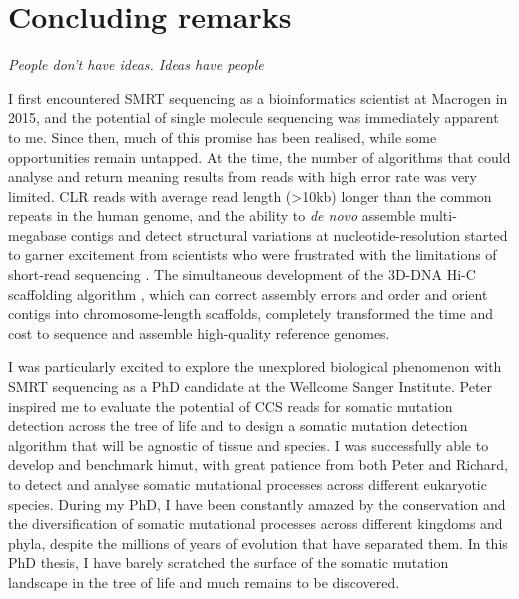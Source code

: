 \section{Concluding remarks}

\textit{People don't have ideas. Ideas have people}
\begin{flushright}  \end{flushright} 

I first encountered SMRT sequencing as a bioinformatics scientist at Macrogen in 2015, and the potential of single molecule sequencing was immediately apparent to me. Since then, much of this promise has been realised, while some opportunities remain untapped. At the time, the number of algorithms that could analyse and return meaning results from reads with high error rate was very limited. CLR reads with average read length (>10kb) longer than the common repeats in the human genome, and the ability to \textit{de novo} assemble multi-megabase contigs \cite {} and detect structural variations at nucleotide-resolution \cite{} started to garner excitement from scientists who were frustrated with the limitations of short-read sequencing \cite{}. The simultaneous development of the 3D-DNA Hi-C scaffolding algorithm \cite{}, which can correct assembly errors and order and orient contigs into chromosome-length scaffolds, completely transformed the time and cost to sequence and assemble high-quality reference genomes. 

I was particularly excited to explore the unexplored biological phenomenon with SMRT sequencing as a PhD candidate at the Wellcome Sanger Institute. Peter inspired me to evaluate the potential of CCS reads for somatic mutation detection across the tree of life and to design a somatic mutation detection algorithm that will be agnostic of tissue and species. I was successfully able to develop and benchmark himut, with great patience from both Peter and Richard, to detect and analyse somatic mutational processes across different eukaryotic species. During my PhD, I have been constantly amazed by the conservation and the diversification of somatic mutational processes across different kingdoms and phyla, despite the millions of years of evolution that have separated them. In this PhD thesis, I have barely scratched the surface of the somatic mutation landscape in the tree of life and much remains to be discovered. 

